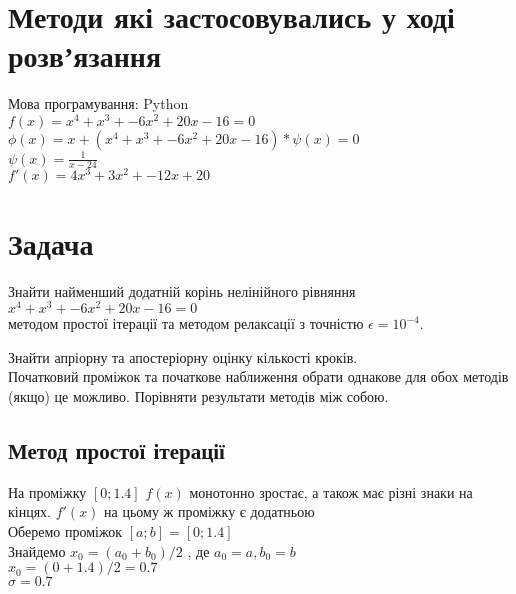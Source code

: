 \documentclass[a4paper, 12pt]{article}
\begin{document}

\section{Методи які застосовувались у ході розвʼязання}
Мова програмування: Python \\[0.25ex]

$f(x) = x^4 + x^3 + -6x^2 + 20x - 16 = 0$ \\[0.25ex]

$\phi(x) = x + (x^4 + x^3 + -6x^2 + 20x - 16) * \psi(x)= 0$ \\[0.25ex]

$\psi(x) =  \frac{1}{x - 24}$
\\[0.35ex]

$f'(x) = 4x^3 + 3x^2 + -12x + 20$ \\[0.25ex]

\section{Задача}
Знайти найменший додатній корінь нелінійного рівняння  \\ [0.25ex]
$x^4 + x^3 + -6x^2 + 20x - 16 = 0$ \\
методом простої ітерації та методом релаксації з точністю $\epsilon = 10^{-4}$.

Знайти апріорну та апостеріорну оцінку кількості кроків. \\
Початковий проміжок та початкове наближення обрати однакове для обох методів (якщо) це можливо. Порівняти результати методів між собою. \\

\subsection{Метод простої ітерації}

На проміжку $[0; 1.4]$ $f(x)$ монотонно зростає, а також має різні знаки на кінцях. $f'(x)$ на цьому ж проміжку є додатньою
\\[0.25ex]

Оберемо проміжок $[a;b] = [0; 1.4]$ \\[0.25ex]

Знайдемо $x_{0} = (a_{0} + b_{0})/2$ , де $a_{0} = a, b_{0} = b$ \\[0.25ex]

$x_{0} = (0 + 1.4)/2 = 0.7$ \\[0.25ex]

$ \sigma = 0.7$ \\[0.25ex]
\end{document}
